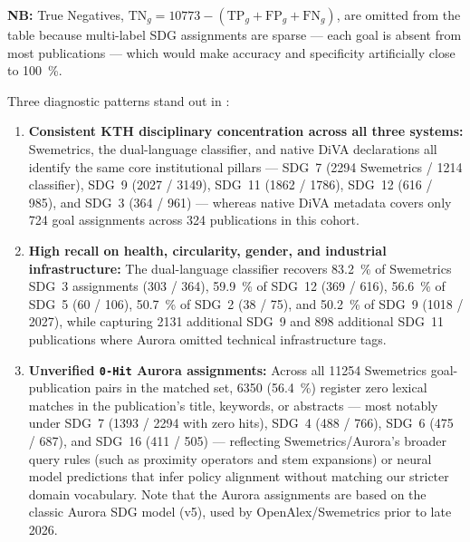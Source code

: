 \textbf{NB:} True Negatives, $\text{TN}_g = \num{10773} - (\text{TP}_g + \text{FP}_g + \text{FN}_g)$, are omitted from the table because multi-label \gls{SDG} assignments are sparse --- each goal is absent from most publications --- which would make accuracy and specificity artificially close to \qty{100}{\percent}.
\medskip

Three diagnostic patterns stand out in :
\begin{enumerate}
  \item \textbf{Consistent \gls{KTH} disciplinary concentration across all three systems:} Swemetrics, the dual-language classifier, and native \gls{DiVA} declarations all identify the same core institutional pillars --- \gls{SDG}~7 (\num{2294} Swemetrics / \num{1214} classifier), \gls{SDG}~9 (\num{2027} / \num{3149}), \gls{SDG}~11 (\num{1862} / \num{1786}), \gls{SDG}~12 (\num{616} / \num{985}), and \gls{SDG}~3 (\num{364} / \num{961}) --- whereas native \gls{DiVA} metadata covers only \num{724} goal assignments across \num{324} publications in this cohort.
  
  \item \textbf{High recall on health, circularity, gender, and industrial infrastructure:} The dual-language classifier recovers \qty{83.2}{\percent} of Swemetrics \gls{SDG}~3 assignments (\num{303} / \num{364}), \qty{59.9}{\percent} of \gls{SDG}~12 (\num{369} / \num{616}), \qty{56.6}{\percent} of \gls{SDG}~5 (\num{60} / \num{106}), \qty{50.7}{\percent} of \gls{SDG}~2 (\num{38} / \num{75}), and \qty{50.2}{\percent} of \gls{SDG}~9 (\num{1018} / \num{2027}), while capturing \num{2131} additional \gls{SDG}~9 and \num{898} additional \gls{SDG}~11 publications where Aurora omitted technical infrastructure tags.
  
  \item \textbf{Unverified \texttt{0-Hit} Aurora assignments:} Across all \num{11254} Swemetrics goal-publication pairs in the matched set, \num{6350} (\qty{56.4}{\percent}) register zero lexical matches in the publication's title, keywords, or abstracts --- most notably under \gls{SDG}~7 (\num{1393} / \num{2294} with zero hits), \gls{SDG}~4 (\num{488} / \num{766}), \gls{SDG}~6 (\num{475} / \num{687}), and \gls{SDG}~16 (\num{411} / \num{505}) --- reflecting Swemetrics/Aurora's broader query rules (such as proximity operators and stem expansions) or neural model predictions that infer policy alignment without matching our stricter domain vocabulary. Note that the Aurora assignments are based on the classic Aurora \gls{SDG} model (v5), used by OpenAlex/Swemetrics prior to late 2026.
\end{enumerate}


